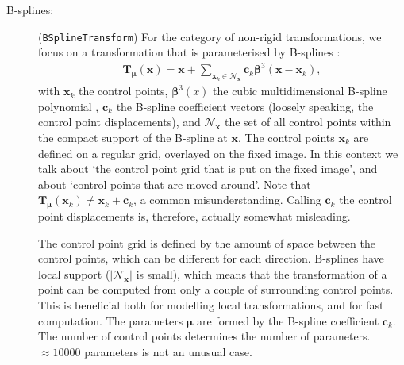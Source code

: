 \documentclass[]{report}
\newcommand{\vx}{\bm{x}}
\newcommand{\vmu}{\bm{\mu}}
\newcommand{\vTm}{\bm{T}_{\vmu}}
\newcommand{\vTmx}{\bm{T}_{\vmu}(\bm{x})}
\newcommand{\NN}{\mathcal{N}}
\begin{document}
\begin{description}
\item[B-splines:] (\texttt{BSplineTransform}) For the category of non-rigid transformations, we focus on a
transformation that is parameterised by B-splines
\citep{RueckertEA99}:
\begin{align}
\vTmx = \vx + \sum_{\vx_k \in \NN_{\vx}} \bm{c}_k \bm{\beta}^3(\vx
- \vx_k),\label{eq:bspline}
\end{align}
with $\vx_k$ the control points, $\bm{\beta}^3(x)$ the cubic
multidimensional B-spline polynomial \citep{Unser99}, $\bm{c}_k$
the B-spline coefficient vectors (loosely speaking, the control
point displacements), and $\NN_{\vx}$ the set of all control
points within the compact support of the B-spline at $\vx$. The
control points  $\vx_k$ are defined on a regular grid, overlayed
on the fixed image. In this context we talk about `the control
point grid that is put on the fixed image', and about `control
points that are moved around'. Note that $\vTm(\vx_k)\neq \vx_k +
\bm{c}_k$, a common misunderstanding. Calling $\bm{c}_k$ the
control point displacements is, therefore, actually somewhat
misleading.

The control point grid is defined by the amount of space between the
control points, which can be different for each direction. B-splines
have local support ($|\NN_{\vx}|$ is small), which means that the
transformation of a point can be computed from only a couple of
surrounding control points. This is beneficial both for modelling
local transformations, and for fast computation. The parameters
$\vmu$ are formed by the B-spline coefficient $\bm{c}_k$. The number
of control points determines the number of parameters. $\approx
10000$ parameters is not an unusual case.
\end{description}
\end{document}
